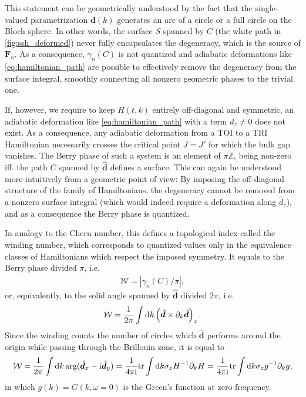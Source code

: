 This statement can be geometrically understood by the fact that the single-valued parametrization $\bm d(k)$ generates an arc of a circle or a full circle on the Bloch sphere.
In other words, the surface $S$ spanned by $C$ (the white path in \cref{fig:ssh_deformed}) never fully encapsulates the degeneracy, which is the source of ${\bm F}_n$.
As a consequence, $\gamma_n(C)$ is not quantized and adiabatic deformations like \cref{eq:hamiltonian_path} are possible to effectively remove the degeneracy from the surface integral, smoothly connecting all nonzero geometric phases to the trivial one.

If, however, we require to keep $H(t,k)$ entirely off-diagonal and symmetric, an adiabatic deformation like \cref{eq:hamiltonian_path} with a term $d_z\neq0$ does not exist.
As a consequence, any adiabatic deformation from a TOI to a TRI Hamiltonian necessarily crosses the critical point $J=J'$ for which the bulk gap vanishes.
The Berry phase of such a system is an element of $\pi\mathds Z$, being non-zero iff. the path $C$ spanned by $\hat{\bm d}$ defines a surface.
This can again be understood more intuitively from a geometric point of view:
By imposing the off-diagonal structure of the family of Hamiltonians, the degeneracy cannot be removed from a nonzero surface integral (which would indeed require a deformation along $\hat {d}_z$), and as a consequence the Berry phase is quantized.

In analogy to the Chern number, this defines a topological index called the winding number, which corresponds to quantized values only in the equivalence classes of Hamiltonians which respect the imposed symmetry.
It equals to the Berry phase divided $\pi$, i.e.
\begin{align}
    \mathcal W = |\gamma_n(C)/\pi|,
\end{align}
or, equivalently, to the solid angle spanned by $\hat{\bm d}$ divided $2\pi$, i.e.
\begin{align}
    \mathcal W = \frac1{2\pi}\int\mathrm d k\left( \hat{\bm d}\times\partial_k\hat{\bm d} \right)_z.
\end{align}
Since the winding counts the number of circles which $\hat{\bm d}$ performs around the origin while passing through the Brillouin zone, it is equal to
\begin{align}
    \mathcal W = \frac{1}{2\pi}\int\mathrm d k \arg(\hat{\bm d}_x - \mathrm i \hat{\bm d}_y)
    =
    \frac{1}{4\pi\mathrm i} {\rm tr}\int\mathrm d k \sigma_z H^{-1}\partial_k H
    =
    \frac{1}{4\pi\mathrm i} {\rm tr}\int\mathrm d k \sigma_z g^{-1}\partial_k g,
    \label{eq:winding_number}
\end{align}
in which $g(k)=G(k,\omega=0)$ is the Green's function at zero frequency.

